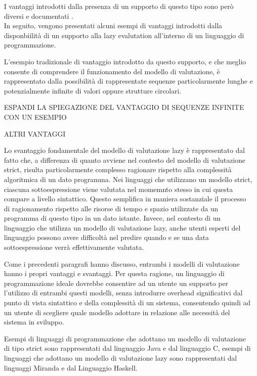 I vantaggi introdotti dalla presenza di un supporto di questo tipo sono però diversi e documentati \cite{SICP}.\\

In seguito, vengono presentati alcuni esempi di vantaggi introdotti dalla disponbiilità di un supporto alla lazy evalutation all'interno di un linguaggio di programmazione.

L'esempio tradizionale di vantaggio introdotto da questo supporto, e che meglio consente di comprendere il funzionamento del modello di valutazione, è rappresentato dalla possibilità di rappresentate sequenze particolarmente lunghe e potenzialmente infinite di valori oppure strutture circolari.

ESPANDI LA SPIEGAZIONE DEL VANTAGGIO DI SEQUENZE INFINITE CON UN ESEMPIO

ALTRI VANTAGGI

Lo svantaggio fondamentale del modello di valutazione lazy è rappresentato dal fatto che, a differenza di quanto avviene nel contesto del modello di valutazione strict, risulta particolarmente complesso ragionare rispetto alla complessità algoritmica di un dato programma. Nei linguaggi che utilizzano un modello strict, ciascuna sottoespressione viene valutata nel momemnto stesso in cui questa compare a livello sintattico. Questo semplifica in maniera sostanziale il processo di ragionamento rispetto alle risorse di tempo e spazio utilizzate da un programma di questo tipo in un dato istante. Invece, nel contesto di un linguaggio che utilizza un modello di valutazione lazy, anche utenti esperti del linguaggio possono avere difficoltà nel predire quando e se una data sottoespressione verrà effettivamente valutata.

Come i precedenti paragrafi hanno discusso, entrambi i modelli di valutazione hanno i propri vantaggi e svantaggi. Per questa ragione, un linguaggio di programmazione ideale dovrebbe consentire ad un utente un supporto per l'utilizzo di entrambi questi modelli, senza introdurre overhead significativi dal punto di vista sintattico e della complessità di un sistema, consentendo quindi ad un utente di scegliere quale modello adottare in relazione alle necessità del sistema in sviluppo.

Esempi di linguaggi di programmazione che adottano un modello di valutazione di tipo strict sono rappresentati dal linguaggio Java e dal linguaggio C, esempi di linguaggi che adottano un modello di valutazione lazy sono rappresentati dal linguaggi Miranda e dal Linguaggio Haskell.

